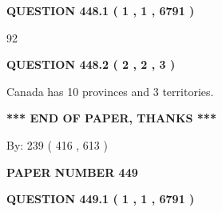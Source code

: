 \documentclass[12pt]{article}
\begin{document}
   
  
\vspace{0.2in}
  
{\textbf{\Large{QUESTION
448.1 
 ( 1 , 1 , 6791 )
}}}
  
  
 
 
\noindent{}

92
 
 
  
\vspace{0.2in}
  
{\textbf{\Large{QUESTION
448.2 
 ( 2 , 2 , 3 )
}}}
  
  
 
 
\noindent{}
 
 
Canada has 10  provinces and 3 territories.
 
 
 
 
   
   
 \vspace{0.2in}
 
   
   
   
   
\vspace{1.0in} 
{\textbf{\large{ *** END OF PAPER, THANKS *** }}} 
   
   
\hspace{1.0in} By: 
 239 ( 416 ,  613 )
   
   
   
   
\newpage 
\setcounter{page}{ 
   449001 } 
   
   
   
   
 {\textbf{ \Large{ PAPER NUMBER  449  }}}
   
   
\vspace{0.2in}
   
   
   
   
   
   
 \vspace{0.2in}
 
 
 
 
   
   
  
\vspace{0.2in}
  
{\textbf{\Large{QUESTION
449.1 
 ( 1 , 1 , 6791 )
}}}
  
\end{document}

